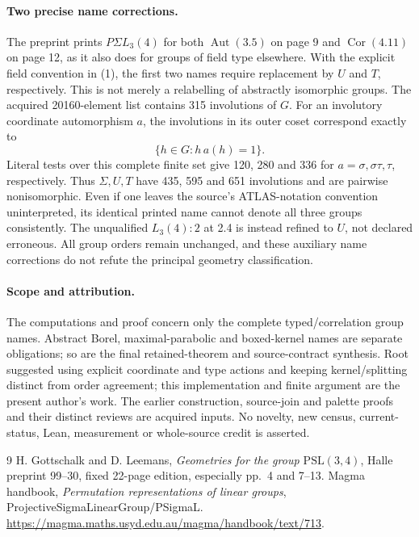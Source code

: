 \documentclass[11pt]{article}
\newcommand{\Aut}{\operatorname{Aut}}\newcommand{\Cor}{\operatorname{Cor}}
\begin{document}
\paragraph{Two precise name corrections.}
The preprint prints $P\Sigma L_3(4)$ for both $\Aut(3.5)$ on page 9 and
$\Cor(4.11)$ on page 12, as it also does for groups of field type elsewhere.
With the explicit field convention in (1), the first two names require
replacement by $U$ and $T$, respectively. This is not merely a relabelling
of abstractly isomorphic groups. The acquired 20160-element list contains
315 involutions of $G$. For an involutory coordinate automorphism $a$,
the involutions in its outer coset correspond exactly to
\[
 \{h\in G:h\,a(h)=1\}.
\]
Literal tests over this complete finite set give 120, 280 and 336 for
$a=\sigma,\sigma\tau,\tau$, respectively. Thus $\Sigma,U,T$ have
435, 595 and 651 involutions and are pairwise nonisomorphic. Even if one
leaves the source's ATLAS-notation convention uninterpreted, its identical
printed name cannot denote all three groups consistently. The unqualified
$L_3(4):2$ at 2.4 is instead refined to $U$, not declared erroneous.
All group orders remain unchanged, and these auxiliary name corrections
do not refute the principal geometry classification.

\paragraph{Scope and attribution.}
The computations and proof concern only the complete typed/correlation
group names. Abstract Borel, maximal-parabolic and boxed-kernel names are
separate obligations; so are the final retained-theorem and source-contract
synthesis. Root suggested using explicit coordinate and type actions and
keeping kernel/splitting distinct from order agreement; this implementation
and finite argument are the present author's work. The earlier construction,
source-join and palette proofs and their distinct reviews are acquired inputs.
No novelty, new census, current-status, Lean, measurement or whole-source
credit is asserted.

\begin{thebibliography}{9}
 H. Gottschalk and D. Leemans, \emph{Geometries for the group
$\mathrm{PSL}(3,4)$}, Halle preprint 99--30, fixed 22-page edition,
especially pp.~4 and 7--13.
 Magma handbook, \emph{Permutation representations of linear
groups}, ProjectiveSigmaLinearGroup/PSigmaL.\newline
\url{https://magma.maths.usyd.edu.au/magma/handbook/text/713}.
\end{thebibliography}
\end{document}
